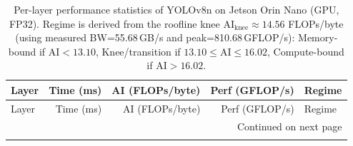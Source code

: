 \documentclass[12pt,a4paper]{report}
\begin{document}
\begin{longtable}{p{} r r r p{}}
\caption{Per-layer performance statistics of YOLOv8n on Jetson Orin Nano (GPU, FP32). Regime is derived
from the roofline knee $\mathrm{AI}_{\mathrm{knee}}\approx 14.56$ FLOPs/byte (using measured BW=55.68\,GB/s and
peak=810.68\,GFLOP/s): Memory-bound if AI$<13.10$, Knee/transition if $13.10\le$AI$\le 16.02$, Compute-bound
if AI$>16.02$.}
\label{tab:roofline_orin_layers_all_orin}\\

\toprule
Layer & Time (ms) & AI (FLOPs/byte) & Perf (GFLOP/s) & Regime \\
\midrule
\endfirsthead

\toprule
Layer & Time (ms) & AI (FLOPs/byte) & Perf (GFLOP/s) & Regime \\
\midrule
\endhead

\midrule
\multicolumn{5}{r}{\small Continued on next page} \\
\endfoot

\bottomrule
\endlastfoot


\end{longtable}
\end{document}
